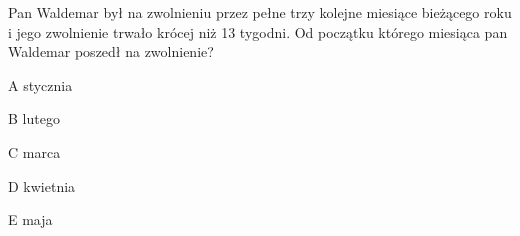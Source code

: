 \begin{tresc}
Pan Waldemar był na zwolnieniu przez pełne trzy kolejne miesiące bieżącego roku i jego zwolnienie trwało krócej niż 13 tygodni. Od początku którego miesiąca pan Waldemar poszedł na zwolnienie?
\end{tresc}
\begin{wariant}{A} stycznia \end{wariant}
\begin{wariant}{B} lutego \end{wariant}
\begin{wariant}{C} marca \end{wariant}
\begin{wariant}{D} kwietnia \end{wariant}
\begin{wariant}{E} maja \end{wariant}
